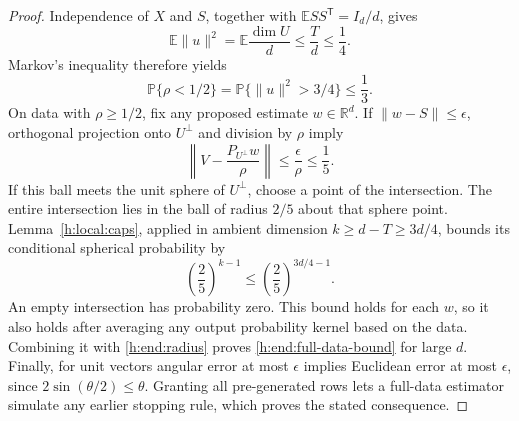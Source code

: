 \begin{proof}
Independence of $X$ and $S$, together with
$\mathbb E SS^{\mathsf T}=I_d/d$, gives
\[
 \mathbb E\|u\|^2
 =\mathbb E\frac{\dim U}{d}
 \le\frac Td\le\frac14.
\]
Markov's inequality therefore yields
\begin{equation}\label{h:end:radius}
 \mathbb P\{\rho<1/2\}
 =\mathbb P\{\|u\|^2>3/4\}\le\frac13.
\end{equation}
On data with $\rho\ge1/2$, fix any proposed estimate
$w\in\mathbb R^d$. If $\|w-S\|\le\epsilon$, orthogonal projection
onto $U^\perp$ and division by $\rho$ imply
\[
 \left\|V-\frac{P_{U^\perp}w}{\rho}\right\|
 \le\frac{\epsilon}{\rho}\le\frac15.
\]
If this ball meets the unit sphere of $U^\perp$, choose a point of
the intersection. The entire intersection lies in the ball of
radius $2/5$ about that sphere point. Lemma~\ref{h:local:caps},
applied in ambient dimension $k\ge d-T\ge3d/4$, bounds its
conditional spherical probability by
\[
 \left(\frac25\right)^{k-1}
 \le\left(\frac25\right)^{3d/4-1}.
\]
An empty intersection has probability zero. This bound holds for
each $w$, so it also holds after averaging any output probability
kernel based on the data. Combining it with
\eqref{h:end:radius} proves \eqref{h:end:full-data-bound} for large
$d$. Finally, for unit vectors angular error at most $\epsilon$
implies Euclidean error at most $\epsilon$, since
$2\sin(\theta/2)\le\theta$. Granting all pre-generated rows lets a
full-data estimator simulate any earlier stopping rule, which proves
the stated consequence.
\end{proof}
